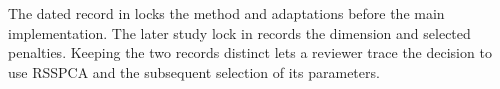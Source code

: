 \documentclass[11pt,a4paper]{article}
\begin{document}
The dated record in  locks the method and adaptations before the main implementation. The later study lock in  records the dimension and selected penalties. Keeping the two records distinct lets a reviewer trace the decision to use RSSPCA and the subsequent selection of its parameters.

\clearpage

\clearpage

\clearpage

\clearpage
\renewcommand{\bibsection}{\section*{References}}


\end{document}
